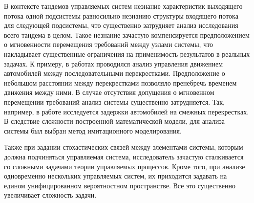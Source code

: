 В контексте тандемов управляемых систем незнание характеристик выходящего потока одной подсистемы равносильно незнанию структуры входящего потока для следующей подсистемы, что существенно затрудняет анализ исследования всего тандема в целом. Такое незнание зачастую компенсируется предположением о мгновенности перемещения требований между узлами системы, что накладывает существенные ограничения на применимость результатов в реальных задачах. К примеру, в работах \cite{AfanasyevaBulinskaya:2010, AfanasyevaBulinskaya:2011} проводился анализ управления движением автомобилей между последовательными перекрестками. Предположение о небольшом расстоянии между перекрестками позволяло пренебречь временем движения между ними.  В случае отсутствия допущения о мгновенном перемещении требований анализ системы существенно затрудняется. Так, например, в работе \cite{Yamada} исследуется задержки автомобилей на смежных перекрестках. В следствие сложности построенной математической модели, для анализа системы был выбран метод имитационного моделирования. 

Также при задании стохастических связей между элементами системы, которым должна подчиняться управляемая система, исследователь зачастую сталкивается со сложными задачами теории управляемых процессов. Кроме того, при анализе одновременно нескольких управляемых систем, их приходится задавать на едином унифицированном вероятностном пространстве. Все это существенно увеличивает сложность задачи.

